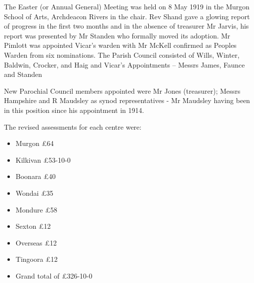The Easter (or Annual General) Meeting was held on 8 May 1919 in the Murgon School of Arts, Archdeacon Rivers in the chair. Rev Shand gave a glowing report of progress in the first two months and in the absence of treasurer Mr Jarvis, his report was presented by Mr Standen who formally moved its adoption. Mr Pimlott was appointed Vicar's warden with Mr McKell confirmed as Peoples Warden from six nominations. The Parish Council consisted of Wills, Winter, Baldwin, Crocker, and Haig and Vicar's Appointments -- Messrs James, Faunce and Standen



New Parochial Council members appointed were Mr Jones (treasurer); Messrs Hampshire and R Maudsley as synod representatives - Mr Maudsley having been in this position since his appointment in 1914.



The revised assessments for each centre were:



\begin{itemize}

\item

  Murgon \pounds64

\item

  Kilkivan \pounds53-10-0

\item

  Boonara \pounds40

\item

  Wondai \pounds35

\item

  Mondure \pounds58

\item

  Sexton \pounds12

\item

  Overseas \pounds12

\item

  Tingoora \pounds12

\item

  Grand total of \pounds326-10-0

\end{itemize}



